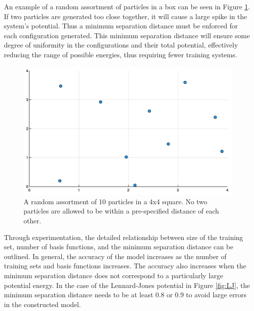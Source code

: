 \par An example of a random assortment of particles in a box can be seen in Figure \ref{fig:tenParticles}. If two particles are generated too close together, it will cause a large spike in the system's potential. Thus a minimum separation distance must be enforced for each configuration generated. This minimum separation distance will ensure some degree of uniformity in the configurations and their total potential, effectively reducing the range of possible energies, thus requiring fewer training systems. 

\begin{figure}[h]
\includegraphics[scale = 0.3]{Figures/tenParticles}
\caption{A random assortment of 10 particles in a 4x4 square. No two particles are allowed to be within a pre-specified distance of each other. 
\label{fig:tenParticles}} 
\end{figure}

\par Through experimentation, the detailed relationship between size of the training set, number of basis functions, and the minimum separation distance can be outlined. In general, the accuracy of the model increases as the number of training sets and basis functions increases. The accuracy also increases when the minimum separation distance does not correspond to a particularly large potential energy. In the case of the Lennard-Jones potential in Figure \ref{fig:LJ}, the minimum separation distance needs to be at least 0.8 or 0.9 to avoid large errors in the constructed model.



